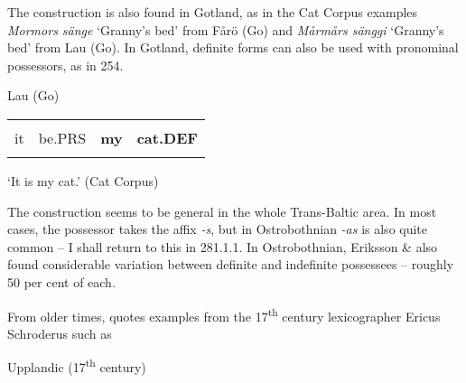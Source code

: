 \begin{styleBodytextC}
The construction is also found in Gotland, as in the Cat Corpus examples \textit{Mormors sänge} ‘Granny’s bed’ from Fårö (Go) and \textit{Mårmårs sänggi }‘Granny’s bed’ from Lau (Go). In Gotland, definite forms can also be used with pronominal possessors, as in 254.

\end{styleBodytextC}

\begin{listWWNumileveli}
\item 

\begin{styleExample}
\label{bkm:Ref155247297}Lau (Go)

\end{styleExample}

\end{listWWNumileveli}

\begin{tabular}{llll}
\lsptoprule
\multicolumn{4}{l}{De

}\\
it & be.PRS & {\bfseries my} & {\bfseries cat.DEF}\\
\lspbottomrule
\end{tabular}

\begin{styleTranslation}
 ‘It is my cat.’ (Cat Corpus)

\end{styleTranslation}

\begin{styleBodyTextFirst}
The construction seems to be general in the whole Trans-Baltic area. In most cases, the possessor takes the affix\textit{ -s}, but in Ostrobothnian\textit{ -as }is also quite common – I shall return to this in 281.1.1. In Ostrobothnian, Eriksson \& \citet{Rendahl1999} also found considerable variation between definite and indefinite possessees – roughly 50 per cent of each. 

\end{styleBodyTextFirst}

\begin{styleBodytextC}
From older times, \citet[523]{Hesselman1908} quotes examples from the 17\textsuperscript{th} century lexicographer Ericus Schroderus such as

\end{styleBodytextC}

\begin{listWWNumileveli}
\item 

\begin{styleExample}
Upplandic (17\textsuperscript{th} century)

\end{styleExample}

\end{listWWNumileveli}

